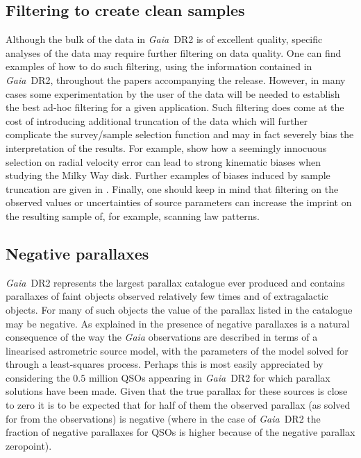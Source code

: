 \documentclass[longauth]{aa_gaia} %
\newcommand\gaia{\textit{Gaia}}
\newcommand\gdr[1]{\gaia~DR#1}
\begin{document}
\subsection{Filtering to create clean samples}

Although the bulk of the data in \gdr{2} is of excellent quality, specific analyses of the data
may require further filtering on data quality. One can find examples of how to do such filtering,
using the information contained in \gdr{2}, throughout the papers accompanying the release.
However, in many cases some experimentation by the user of the data will be needed to establish the
best ad-hoc filtering for a given application. Such filtering does come at the cost of introducing
additional truncation of the data which will further complicate the survey/sample selection function
and may in fact severely bias the interpretation of the results. For example, \cite{DR2-DPACP-33} show
how a seemingly innocuous selection on radial velocity error can lead to strong kinematic biases
when studying the Milky Way disk. Further examples of biases induced by sample truncation are given
in \cite{DR2-DPACP-38}. Finally, one should keep in mind that filtering on the observed values or
uncertainties of source parameters can increase the imprint on the resulting sample of, for example,
scanning law patterns.

\subsection{Negative parallaxes}

\gdr{2} represents the largest parallax catalogue ever produced and contains parallaxes of faint
objects observed relatively few times and of extragalactic objects. For many of such objects the
value of the parallax listed in the catalogue may be negative. As explained in \cite{DR2-DPACP-38} the
presence of negative parallaxes is a natural consequence of the way the {\gaia} observations are
described in terms of a linearised astrometric source model, with the parameters of the model solved
for through a least-squares process. Perhaps this is most easily appreciated by considering the
$0.5$ million QSOs appearing in \gdr{2} for which parallax solutions have been made. Given that
the true parallax for these sources is close to zero it is to be expected that for half of them the
observed parallax (as solved for from the observations) is negative (where in the case of \gdr{2}
the fraction of negative parallaxes for QSOs is higher because of the negative parallax zeropoint). 
\end{document}
